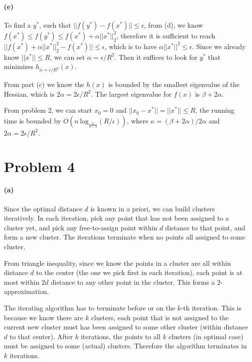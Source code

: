 \documentclass[12pt]{article}
\begin{document}
\paragraph{(e)} To find a $y^*$, such that $||f(y^*) - f(x^*)|| \leq \epsilon$, from (d), we know $f(x^*) \leq f(y^*) \leq f(x^*) + \alpha||x^*||^2_2$, therefore it is sufficient to reach $||f(x^*) + \alpha||x^*||^2_2- f(x^*)|| \leq \epsilon$, which is to have $\alpha||x^*||^2 \leq \epsilon$. Since we already know $||x^*|| \leq R$, we can set $\alpha = \epsilon/ R^2$. Then it suffices to look for $y^*$ that minimizes $h_{\alpha = \epsilon/ R^2}(x)$.

From part (c) we know the $h(x)$ is bounded by the smallest eigenvalue of the Hessian, which is $2\alpha = 2\epsilon / R^2$. The largest eigenvalue for $f(x)$ is $\beta + 2\alpha$.

From problem 2, we can start $x_0 = 0$ and $||x_0 - x^*|| = ||x^*|| \leq R$, the running time is bounded by $O\left(n \:\text{log}_{\frac{\kappa}{\kappa - 1}}(R/\epsilon)\right)$, where $\kappa = (\beta + 2\alpha) / 2\alpha$ and $2\alpha = 2\epsilon / R^2$. 

\newpage
\section*{Problem 4}
\paragraph{(a)} Since the optimal distance $d$ is known in a priori, we can build clusters iteratively. In each iteration, pick any point that has not been assigned to a cluster yet, and pick any free-to-assign point within $d$ distance to that point, and form a new cluster. The iterations terminate when no points all assigned to some cluster. 

From triangle inequality, since we know the points in a cluster are all within distance $d$ to the center (the one we pick first in each iteration), each point is at most within $2d$ distance to any other point in the cluster. This forms a $2$-approximation.

The iterating algorithm has to terminate before or on the $k$-th iteration. This is because we know there are $k$ clusters, each point that is not assigned to the current new cluster must has been assigned to some other cluster (within distance $d$ to that center). After $k$ iterations, the points to all $k$ clusters (in optimal case) must be assigned to some (actual) clusters. Therefore the algorithm terminates in $k$ iterations. 
\end{document}
